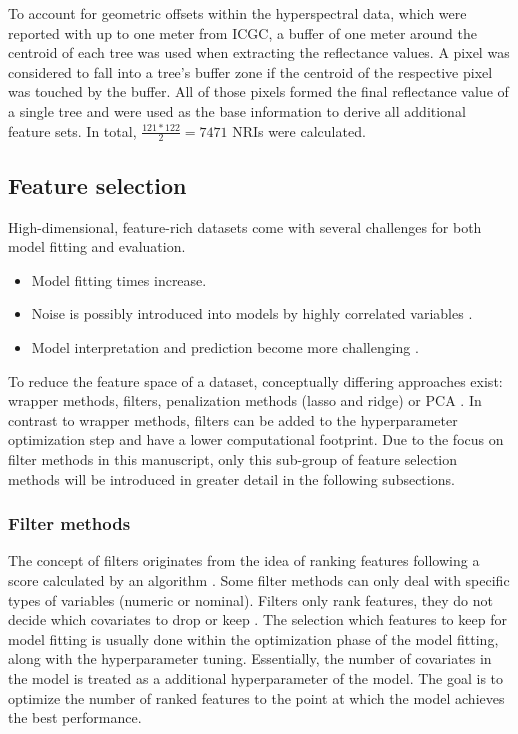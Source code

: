 \documentclass[final]{IEEEtran}
\begin{document}
To account for geometric offsets within the hyperspectral data, which were reported with up to one meter from \ac{ICGC}, a buffer of one meter around the centroid of each tree was used when extracting the reflectance values.
A pixel was considered to fall into a tree's buffer zone if the centroid of the respective pixel was touched by the buffer.
All of those pixels formed the final reflectance value of a single tree and were used as the base information to derive all additional feature sets.
In total, \(\frac{121*122}{2} = 7471\) NRIs were calculated.

\subsection{Feature selection}

High-dimensional, feature-rich datasets come with several challenges for both model fitting and evaluation.

\begin{itemize}
	\item Model fitting times increase.
	\item Noise is possibly introduced into models by highly correlated variables \cite{johnstoneiainm.2009}.
	\item Model interpretation and prediction become more challenging \cite{johnstoneiainm.2009}.
\end{itemize}

To reduce the feature space of a dataset, conceptually differing approaches exist: wrapper methods, filters, penalization methods (lasso and ridge) or \ac{PCA} \cite{bommert2020, das2001, guyon2003, jolliffe2016}.
In contrast to wrapper methods, filters can be added to the hyperparameter optimization step and have a lower computational footprint.
Due to the focus on filter methods in this manuscript, only this sub-group of feature selection methods will be introduced in greater detail in the following subsections.

\subsubsection{Filter methods}

The concept of filters originates from the idea of ranking features following a score calculated by an algorithm \cite{guyon2003}.
Some filter methods can only deal with specific types of variables (numeric or nominal).
Filters only rank features, they do not decide which covariates to drop or keep \cite{drotar2015}.
The selection which features to keep for model fitting is usually done within the optimization phase of the model fitting, along with the hyperparameter tuning.
Essentially, the number of covariates in the model is treated as a additional hyperparameter of the model.
The goal is to optimize the number of ranked features to the point at which the model achieves the best performance.
\end{document}
